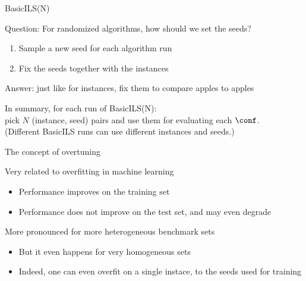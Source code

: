 \begin{frame}[c,fragile]{BasicILS(N)}

Question: For randomized algorithms, how should we set the seeds? \hands
\begin{enumerate}
\item Sample a new seed for each algorithm run
\item Fix the seeds together with the instances
\end{enumerate}
\bigskip
\pause
Answer: just like for instances, fix them to compare apples to apples

\bigskip
\pause
In summary, for each run of BasicILS(N): \\pick $N$ (instance, seed) pairs and use them for evaluating each $\conf$.\\
\pause
(Different BasicILS runs can use different instances and seeds.)

\end{frame}


\begin{frame}[fragile]{The concept of overtuning}

Very related to overfitting in machine learning 
\begin{itemize}
\item Performance improves on the training set
\item Performance does not improve on the test set, and may even degrade
\end{itemize}	

More pronounced for more heterogeneous benchmark sets 
\begin{itemize}
\item But it even happens for very homogeneous sets
\item Indeed, one can even overfit on a single instace, to the \alert{seeds} used for training 
\end{itemize}	

\end{frame}

